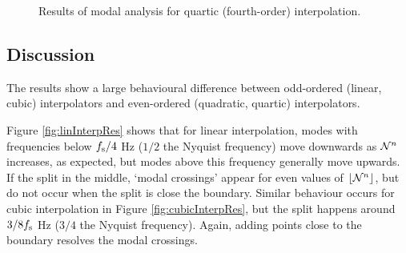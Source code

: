 \begin{figure}[h]
    \centering
    \hfill
    \caption{Results of modal analysis for quartic (fourth-order) interpolation.}\label{fig:quarticInterpRes}
\end{figure}

\subsection{Discussion}
The results show a large behavioural difference between odd-ordered (linear, cubic) interpolators and even-ordered (quadratic, quartic) interpolators.  

Figure \ref{fig:linInterpRes} shows that for linear interpolation, modes with frequencies below $f_\text{s}/4$ Hz ($1/2$ the Nyquist frequency) move downwards as $\mathcal{N}^n$ increases, as expected, but modes above this frequency generally move upwards. If the split in the middle, `modal crossings' appear for even values of $\floor[\Nfrac^n]$, but do not occur when the split is close the boundary. Similar behaviour occurs for cubic interpolation in Figure \ref{fig:cubicInterpRes}, but the split happens around $3/8 f_\text{s}$ Hz ($3/4$ the Nyquist frequency). Again, adding points close to the boundary resolves the modal crossings. 

